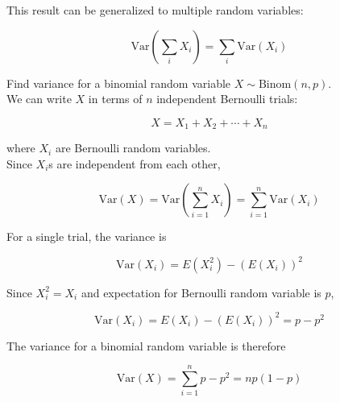 \documentclass[12pt, a4paper]{article}
\newcounter{exa}
\begin{document}
This result can be generalized to multiple random variables:

\[\text{Var}\left( \sum_i X_i \right) = \sum_i \text{Var}(X_i)\]

\begin{texample}
Find variance for a binomial random variable $X\sim\text{Binom}(n,p)$. \\

We can write $X$ in terms of $n$ independent Bernoulli trials:

\[X=X_1+X_2+\cdots+X_n\]

where $X_i$ are Bernoulli random variables. \\

Since $X_i$s are independent from each other,

\[\text{Var}(X)=\text{Var}\left( \sum_{i=1}^n X_i \right) = \sum_{i=1}^n \text{Var}(X_i)\]

For a single trial, the variance is

\[\text{Var}(X_i)=E(X_i^2)-(E(X_i))^2\]

Since $X_i^2=X_i$ and expectation for Bernoulli random variable is $p$,

\[\text{Var}(X_i)=E(X_i)-(E(X_i))^2=p-p^2\]

The variance for a binomial random variable is therefore

\[\text{Var}(X) = \sum_{i=1}^n p-p^2 = np(1-p)\]
\end{texample}
\end{document}
